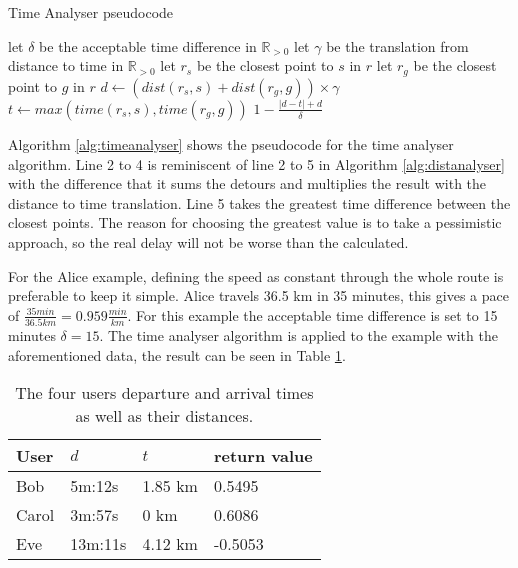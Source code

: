 \begin{algorithm}
	\caption{Time Analyser pseudocode}
	\label{alg:timeanalyser}
	\begin{algorithmic}[1]
		\Require 
		\Statex let $\delta$ be the acceptable time difference in $\mathbb{R}_{>0}$
		\Statex let $\gamma$ be the translation from distance to time in $\mathbb{R}_{>0}$ 
		\Statex 
			\State let $r_s$ be the closest point to $s$ in $r$
			\State let $r_g$ be the closest point to $g$ in $r$
			\State $d \gets (dist(r_s,s) + dist(r_g,g))\times\gamma$
			\State $t \gets max(time(r_s, s), time(r_g, g))$
			\State\Return $1-\frac{|d - t| + d}{\delta}$
		\EndFunction
	\end{algorithmic}
\end{algorithm}

Algorithm \ref{alg:timeanalyser} shows the pseudocode for the time analyser algorithm.
Line 2 to 4 is reminiscent of line 2 to 5 in Algorithm \ref{alg:distanalyser} with the difference that it sums the detours and multiplies the result with the distance to time translation.
Line 5 takes the greatest time difference between the closest points.
The reason for choosing the greatest value is to take a pessimistic approach, so the real delay will not be worse than the calculated.

For the Alice example, defining the speed as constant through the whole route is preferable to keep it simple.
Alice travels 36.5 km in 35 minutes, this gives a pace of  $\frac{35 min}{36.5 km} = 0.959\frac{min}{km} $.
For this example the acceptable time difference is set to 15 minutes $\delta = 15$.
The time analyser algorithm is applied to the example with the aforementioned data, the result can be seen in Table \ref{tbl:time}.

\begin{table}[!ht]
\centering
\begin{tabular}{@{}llll@{}}
\toprule
\textbf{User} 	& \textbf{$d$} & \textbf{$t$} 	& \textbf{return value} 	\\ \midrule
Bob         	& 5m:12s       & 1.85 km	    & 0.5495 			\\
Carol         	& 3m:57s       & 0 km       	& 0.6086        		\\
Eve           	& 13m:11s      & 4.12 km		& -0.5053        		\\ \bottomrule
\end{tabular}
\caption{The four users departure and arrival times as well as their distances.}
\label{tbl:time}
\end{table}

